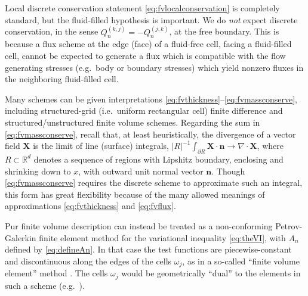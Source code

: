 \documentclass[final,leqno,onefignum,onetabnum]{siamltex1213bueler}
\newcommand\bn{\mathbf{n}}
\newcommand\bX{\mathbf{X}}
\newcommand{\Div}{\nabla\cdot}
\newcommand\RR{\mathbb{R}}
\begin{document}
Local discrete conservation statement \eqref{eq:fvlocalconservation} is completely standard, but the fluid-filled hypothesis is important.  We do \emph{not} expect discrete conservation, in the sense $Q_n^{(k,j)}=-Q_n^{(j,k)}$, at the free boundary.  This is because a flux scheme at the edge (face) of a fluid-free cell, facing a fluid-filled cell, cannot be expected to generate a flux which is compatible with the flow generating stresses (e.g.~body or boundary stresses) which yield nonzero fluxes in the neighboring fluid-filled cell.

Many schemes can be given interpretations \eqref{eq:fvthickness}--\eqref{eq:fvmassconserve}, including structured-grid (i.e.~uniform rectangular cell) finite difference \cite{Bueler2016,MortonMayers2005} and structured/unstructured finite volume \cite{LeVeque2002} schemes.  Regarding the sum in \eqref{eq:fvmassconserve}, recall that, at least heuristically, the divergence of a vector field $\bX$ is the limit of line (surface) integrals, $|R|^{-1} \int_{\partial R} \bX\cdot \bn \to \Div \bX$, where $R\subset \RR^d$ denotes a sequence of regions with Lipshitz boundary, enclosing and shrinking down to $x$, with outward unit normal vector $\bn$.  Though \eqref{eq:fvmassconserve} requires the discrete scheme to approximate such an integral, this form has great flexibility because of the many allowed meanings of approximations \eqref{eq:fvthickness} and \eqref{eq:fvflux}.

Pur finite volume description can instead be treated as a non-conforming Petrov-Galerkin finite element method for the variational inequality \eqref{eq:theVI}, with $A_n$ defined by \eqref{eq:defineAn}.  In that case the test functions are piecewise-constant and discontinuous along the edges of the cells $\omega_j$, as in a so-called ``finite volume element'' method \cite{Bueler2016,Cai1990,EwingLinLin2002}.  The cells $\omega_j$ would be geometrically ``dual'' to the elements in such a scheme (e.g.~\cite{Ringleretal2013}).
\end{document}
